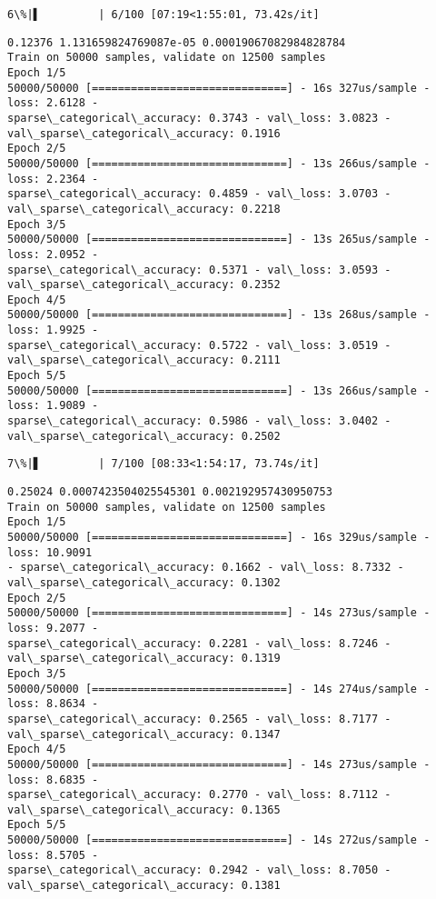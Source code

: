 \documentclass[11pt]{article}
\begin{document}
    \begin{Verbatim}[commandchars=\\\{\}]
  6\%|▌         | 6/100 [07:19<1:55:01, 73.42s/it]
    \end{Verbatim}

    \begin{Verbatim}[commandchars=\\\{\}]
0.12376 1.131659824769087e-05 0.00019067082984828784
Train on 50000 samples, validate on 12500 samples
Epoch 1/5
50000/50000 [==============================] - 16s 327us/sample - loss: 2.6128 -
sparse\_categorical\_accuracy: 0.3743 - val\_loss: 3.0823 -
val\_sparse\_categorical\_accuracy: 0.1916
Epoch 2/5
50000/50000 [==============================] - 13s 266us/sample - loss: 2.2364 -
sparse\_categorical\_accuracy: 0.4859 - val\_loss: 3.0703 -
val\_sparse\_categorical\_accuracy: 0.2218
Epoch 3/5
50000/50000 [==============================] - 13s 265us/sample - loss: 2.0952 -
sparse\_categorical\_accuracy: 0.5371 - val\_loss: 3.0593 -
val\_sparse\_categorical\_accuracy: 0.2352
Epoch 4/5
50000/50000 [==============================] - 13s 268us/sample - loss: 1.9925 -
sparse\_categorical\_accuracy: 0.5722 - val\_loss: 3.0519 -
val\_sparse\_categorical\_accuracy: 0.2111
Epoch 5/5
50000/50000 [==============================] - 13s 266us/sample - loss: 1.9089 -
sparse\_categorical\_accuracy: 0.5986 - val\_loss: 3.0402 -
val\_sparse\_categorical\_accuracy: 0.2502
    \end{Verbatim}

    \begin{Verbatim}[commandchars=\\\{\}]
  7\%|▋         | 7/100 [08:33<1:54:17, 73.74s/it]
    \end{Verbatim}

    \begin{Verbatim}[commandchars=\\\{\}]
0.25024 0.0007423504025545301 0.002192957430950753
Train on 50000 samples, validate on 12500 samples
Epoch 1/5
50000/50000 [==============================] - 16s 329us/sample - loss: 10.9091
- sparse\_categorical\_accuracy: 0.1662 - val\_loss: 8.7332 -
val\_sparse\_categorical\_accuracy: 0.1302
Epoch 2/5
50000/50000 [==============================] - 14s 273us/sample - loss: 9.2077 -
sparse\_categorical\_accuracy: 0.2281 - val\_loss: 8.7246 -
val\_sparse\_categorical\_accuracy: 0.1319
Epoch 3/5
50000/50000 [==============================] - 14s 274us/sample - loss: 8.8634 -
sparse\_categorical\_accuracy: 0.2565 - val\_loss: 8.7177 -
val\_sparse\_categorical\_accuracy: 0.1347
Epoch 4/5
50000/50000 [==============================] - 14s 273us/sample - loss: 8.6835 -
sparse\_categorical\_accuracy: 0.2770 - val\_loss: 8.7112 -
val\_sparse\_categorical\_accuracy: 0.1365
Epoch 5/5
50000/50000 [==============================] - 14s 272us/sample - loss: 8.5705 -
sparse\_categorical\_accuracy: 0.2942 - val\_loss: 8.7050 -
val\_sparse\_categorical\_accuracy: 0.1381
    \end{Verbatim}
\end{document}

